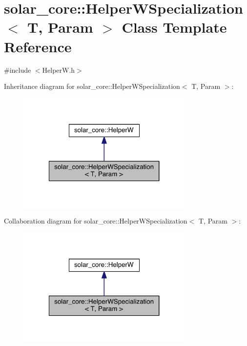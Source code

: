 \hypertarget{classsolar__core_1_1_helper_w_specialization}{}\section{solar\+\_\+core\+:\+:Helper\+W\+Specialization$<$ T, Param $>$ Class Template Reference}
\label{classsolar__core_1_1_helper_w_specialization}


{\ttfamily \#include $<$Helper\+W.\+h$>$}



Inheritance diagram for solar\+\_\+core\+:\+:Helper\+W\+Specialization$<$ T, Param $>$\+:\nopagebreak
\begin{figure}[H]
\begin{center}
\leavevmode
\includegraphics[width=248pt]{classsolar__core_1_1_helper_w_specialization__inherit__graph}
\end{center}
\end{figure}


Collaboration diagram for solar\+\_\+core\+:\+:Helper\+W\+Specialization$<$ T, Param $>$\+:\nopagebreak
\begin{figure}[H]
\begin{center}
\leavevmode
\includegraphics[width=248pt]{classsolar__core_1_1_helper_w_specialization__coll__graph}
\end{center}
\end{figure}
